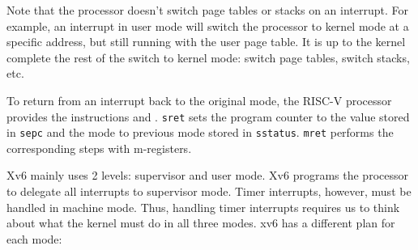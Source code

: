 Note that the processor doesn't switch page tables or stacks on an
interrupt.  For example, an interrupt in user mode will switch the
processor to kernel mode at a specific address, but still running with
the user page table.  It is up to the kernel complete the rest of the
switch to kernel mode: switch page tables, switch stacks, etc.

To return from an interrupt back to the original mode, the RISC-V
processor provides the instructions  and
. \lstinline{sret} sets the program counter to the
value stored in \lstinline{sepc} and the mode to previous mode stored
in \lstinline{sstatus}. \lstinline{mret} performs the corresponding
steps with m-registers.

Xv6 mainly uses 2 levels: supervisor and user mode.  Xv6 programs the
processor to delegate all interrupts to supervisor mode. Timer
interrupts, however, must be handled in machine mode.  Thus, handling
timer interrupts requires us to think about what the kernel must do in
all three modes. xv6 has a different plan for each mode:

